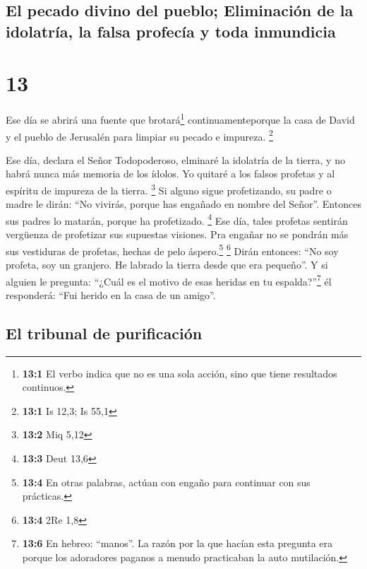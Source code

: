 \hypertarget{el-pecado-divino-del-pueblo-eliminaciuxf3n-de-la-idolatruxeda-la-falsa-profecuxeda-y-toda-inmundicia}{%
\subsection{El pecado divino del pueblo; Eliminación de la idolatría, la
falsa profecía y toda
inmundicia}\label{el-pecado-divino-del-pueblo-eliminaciuxf3n-de-la-idolatruxeda-la-falsa-profecuxeda-y-toda-inmundicia}}

\hypertarget{section-12}{%
\section{13}\label{section-12}}

 Ese día se abrirá una fuente que brotará\footnote{\textbf{13:1}
  El verbo indica que no es una sola acción, sino que tiene resultados
  continuos.} continuamenteporque la casa de David y el pueblo de
Jerusalén para limpiar su pecado e impureza. \footnote{\textbf{13:1} Is
  12,3; Is 55,1}

 Ese día, declara el Señor Todopoderoso, elminaré la
idolatría de la tierra, y no habrá nunca más memoria de los ídolos. Yo
quitaré a los falsos profetas y al espíritu de impureza de la tierra.
\footnote{\textbf{13:2} Miq 5,12}  Si alguno sigue
profetizando, su padre o madre le dirán: ``No vivirás, porque has
engañado en nombre del Señor''. Entonces sus padres lo matarán, porque
ha profetizado. \footnote{\textbf{13:3} Deut 13,6}  Ese
día, tales profetas sentirán vergüenza de profetizar sus supuestas
visiones. Pra engañar no se pondrán más sus vestiduras de profetas,
hechas de pelo áspero.\footnote{\textbf{13:4} En otras palabras, actúan
  con engaño para continuar con sus prácticas.} \footnote{\textbf{13:4}
  2Re 1,8}  Dirán entonces: ``No soy profeta, soy un
granjero. He labrado la tierra desde que era pequeño''.  Y
si alguien le pregunta: ``¿Cuál es el motivo de esas heridas en tu
espalda?''\footnote{\textbf{13:6} En hebreo: ``manos''. La razón por la
  que hacían esta pregunta era porque los adoradores paganos a menudo
  practicaban la auto mutilación.} él responderá: ``Fui herido en la
casa de un amigo''.

\hypertarget{el-tribunal-de-purificaciuxf3n}{%
\subsection{El tribunal de
purificación}\label{el-tribunal-de-purificaciuxf3n}}

